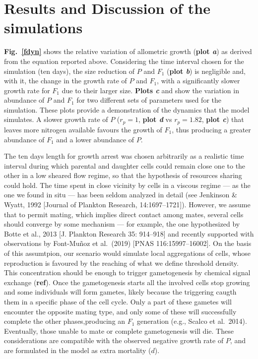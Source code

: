 \documentclass[a4paper,oneside]{article}
\begin{document}
  \section*{Results and Discussion of the simulations}
    \textbf{Fig.~\ref{fdyn}} shows the relative variation of allometric growth (\textbf{plot {\color{blue}\textit{a}}}) as derived from the equation reported above.
    Considering the time interval chosen for the simulation (ten days), the size reduction of $P$ and $F_{1}$ (\textbf{plot {\color{blue}\textit{b}}}) is negligible and, with it, the change in the growth rate of $P$ and $F_{1}$, with a significantly slower growth rate for $F_{1}$ due to their larger size.
    \textbf{Plots {\color{blue}\textit{c}}} and {\textbf{}} show the variation in abundance of $P$ and $F_{1}$ for two different sets of parameters used for the simulation.
    These plots provide a demonstration of the dynamics that the model simulates.
    A slower growth rate of $P$ ($r_p=1$, \textbf{plot {\color{blue}\textit{d}}} vs $r_p=1.82$, \textbf{plot {\color{blue}\textit{c}}}) that leaves more nitrogen available favours the growth of $F_{1}$, thus producing a greater abundance of $F_{1}$ and a lower abundance of $P$.

    The ten days length for growth arrest was chosen arbitrarily as a realistic time interval during which parental and daughter cells could remain close one to the other in a low sheared flow regime, so that the hypothesis of resources sharing could hold.
    The time spent in close vicinity by cells in a viscous regime  --- as the one we found in situ --- has been seldom analyzed in detail (see Jenkinson \& Wyatt, 1992 [Journal of Plankton Research, 14:1697--1721]).
    However, we assume that to permit mating, which implies direct contact among mates, several cells should converge by some mechanism --- for example, the one hypothesized by Botte et al., 2013 [J. Plankton Research 35: 914--918] and recently supported with observations by Font-Mu{\~n}oz et al.~(2019) [PNAS 116:15997--16002].
    On the basis of this assumtpion, our scenario would simulate local aggregations of cells, whose reproduction is favoured by the reaching of what we define threshold density.
    This concentration should be enough to trigger gametogenesis by chemical signal exchange ({\color{green}\textbf{ref}}).
    Once the gametogenesis starts all the involved cells stop growing and some individuals will form gametes, likely because the triggering caugth them in a specific phase of the cell cycle.
    Only a part of these gametes will encounter the opposite mating type, and only some of these will successfully complete the other phases,producing an $F_{1}$ generation (e.g., Scalco et al.~2014).
    Eventually, those unable to mate or complete gametogenesis will die.
    These considerations are compatible with the observed negative growth rate of $P$, and are formulated in the model as extra mortality ($d$).
\end{document}
